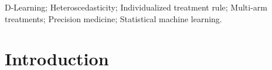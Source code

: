 \documentclass[useAMS,usenatbib]{biom}
\begin{document}
%
\begin{keywords}
D-Learning; Heteroscedasticity; Individualized treatment rule; Multi-arm treatments; Precision medicine; Statistical machine learning.
\end{keywords}


\maketitle


%

\section{Introduction} \label{sec_intro}
\end{document}
